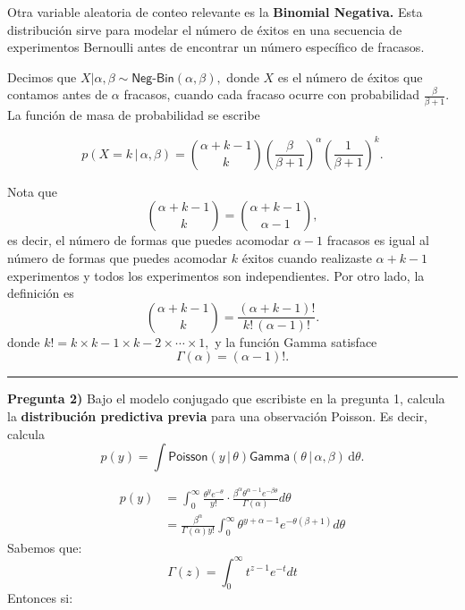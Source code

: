 \documentclass[
]{article}
\begin{document}
Otra variable aleatoria de conteo relevante es la \textbf{Binomial
Negativa.} Esta distribución sirve para modelar el número de éxitos en
una secuencia de experimentos Bernoulli antes de encontrar un número
específico de fracasos.

Decimos que \(X|\alpha, \beta \sim \textsf{Neg-Bin}(\alpha, \beta),\)
donde \(X\) es el número de éxitos que contamos antes de \(\alpha\)
fracasos, cuando cada fracaso ocurre con probabilidad
\(\frac{\beta}{\beta + 1}.\) La función de masa de probabilidad se
escribe

\[ p(X = k \, | \, \alpha, \beta) = {\alpha + k -1 \choose k} \left(\frac{\beta}{\beta + 1}\right)^\alpha \left(\frac{1}{\beta + 1}\right)^k.\]

Nota que
\[{\alpha + k -1 \choose k} = {\alpha + k -1 \choose \alpha -1},\] es
decir, el número de formas que puedes acomodar \(\alpha - 1\) fracasos
es igual al número de formas que puedes acomodar \(k\) éxitos cuando
realizaste \(\alpha + k-1\) experimentos y todos los experimentos son
independientes. Por otro lado, la definición es
\[{\alpha + k -1 \choose k} = \frac{(\alpha + k - 1)!}{k! \, (\alpha - 1)!}.\]
donde \(k! = k \times k-1 \times k-2 \times \cdots \times 1,\) y la
función Gamma satisface \[\Gamma(\alpha) = (\alpha - 1)!.\]

\begin{center}\rule{0.5\linewidth}{0.5pt}\end{center}

\textbf{Pregunta 2)} Bajo el modelo conjugado que escribiste en la
pregunta 1, calcula la \textbf{distribución predictiva previa} para una
observación Poisson. Es decir, calcula
\[p(y) = \int \textsf{Poisson}(y \,| \,\theta) \textsf{Gamma}(\theta \, | \, \alpha, \beta) \, \text{d}\theta.\]

\[
\begin{align}
p(y) &= \int_0^{\infty} \frac{\theta^y e^{-\theta}}{y!} \cdot
\frac{\beta^\alpha \theta^{\alpha-1} e^{-\beta \theta}}{\Gamma(\alpha)} d\theta \\
&= \frac{\beta^\alpha}{\Gamma(\alpha)y!} 
\int_0^\infty\theta^{y+\alpha -1}e^{-\theta(\beta +1)}d\theta
\end{align}
\] Sabemos que: \[ \Gamma(z) = \int_0^\infty t^{z-1}e^{-t}dt\] Entonces
si:
\end{document}
